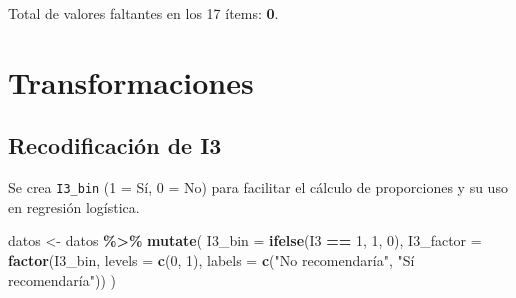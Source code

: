 \documentclass[
  spanish,
]{article}
\newenvironment{Shaded}{\begin{snugshade}}{\end{snugshade}}
\newcommand{\AttributeTok}[1]{\textcolor[rgb]{0.13,0.29,0.53}{#1}}
\newcommand{\ConstantTok}[1]{\textcolor[rgb]{0.56,0.35,0.01}{#1}}
\newcommand{\DecValTok}[1]{\textcolor[rgb]{0.00,0.00,0.81}{#1}}
\newcommand{\FunctionTok}[1]{\textcolor[rgb]{0.13,0.29,0.53}{\textbf{#1}}}
\newcommand{\NormalTok}[1]{#1}
\newcommand{\OtherTok}[1]{\textcolor[rgb]{0.56,0.35,0.01}{#1}}
\newcommand{\SpecialCharTok}[1]{\textcolor[rgb]{0.81,0.36,0.00}{\textbf{#1}}}
\newcommand{\StringTok}[1]{\textcolor[rgb]{0.31,0.60,0.02}{#1}}
\begin{document}
Total de valores faltantes en los 17 ítems: \textbf{0}.

\section{Transformaciones}\label{transformaciones}

\subsection{Recodificación de I3}\label{recodificaciuxf3n-de-i3}

Se crea \texttt{I3\_bin} (1 = Sí, 0 = No) para facilitar el cálculo de
proporciones y su uso en regresión logística.

\begin{Shaded}
\begin{Highlighting}[]
\NormalTok{datos }\OtherTok{\textless{}{-}}\NormalTok{ datos }\SpecialCharTok{\%\textgreater{}\%}
  \FunctionTok{mutate}\NormalTok{(}
    \AttributeTok{I3\_bin    =} \FunctionTok{ifelse}\NormalTok{(I3 }\SpecialCharTok{==} \DecValTok{1}\NormalTok{, }\DecValTok{1}\NormalTok{, }\DecValTok{0}\NormalTok{),}
    \AttributeTok{I3\_factor =} \FunctionTok{factor}\NormalTok{(I3\_bin, }\AttributeTok{levels =} \FunctionTok{c}\NormalTok{(}\DecValTok{0}\NormalTok{, }\DecValTok{1}\NormalTok{),}
                       \AttributeTok{labels =} \FunctionTok{c}\NormalTok{(}\StringTok{"No recomendaría"}\NormalTok{, }\StringTok{"Sí recomendaría"}\NormalTok{))}
\NormalTok{  )}
\end{Highlighting}
\end{Shaded}

\begin{Shaded}
\end{Shaded}
\end{document}
